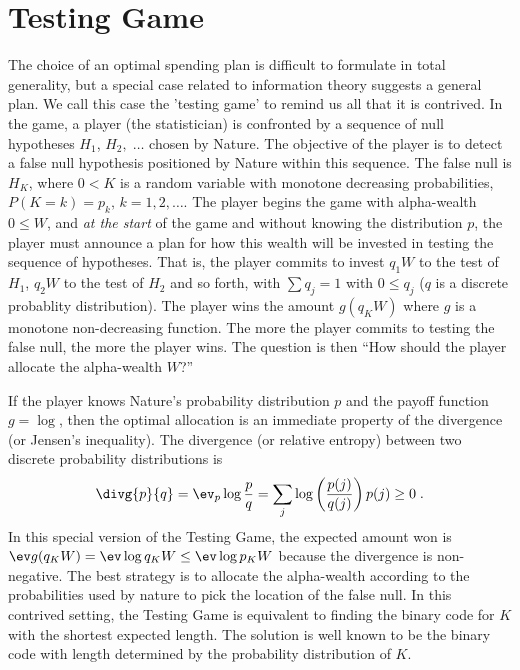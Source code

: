 \documentclass[12pt]{article}
\begin{document}
\section{Testing Game}

 The choice of an optimal spending plan is difficult to formulate in total
 generality, but a special case related to information theory suggests a general
 plan.  We call this case the 'testing game' to remind us all that it is
 contrived.  In the game, a player (the statistician) is confronted by a
 sequence of null hypotheses $H_1$, $H_2, \; \ldots$ chosen by Nature.  The
 objective of the player is to detect a false null hypothesis positioned by
 Nature within this sequence.  The false null is $H_K$, where $0 < K$ is a
 random variable with monotone decreasing probabilities, $P(K=k)=p_k, \,
 k=1,2,\ldots$.  The player begins the game with alpha-wealth $0 \le W$, and
 {\em at the start} of the game and without knowing the distribution $p$, the
 player must announce a plan for how this wealth will be invested in testing the
 sequence of hypotheses.  That is, the player commits to invest $q_1W$ to the
 test of $H_1$, $q_2W$ to the test of $H_2$ and so forth, with $\sum q_j = 1$
 with $0 \le q_j$ ($q$ is a discrete probablity distribution). The player wins
 the amount $g(q_K W)$ where $g$ is a monotone non-decreasing function.  The
 more the player commits to testing the false null, the more the player wins.
  The question is then ``How should the player allocate the alpha-wealth $W$?''


 If the player knows Nature's probability distribution $p$ and the payoff
 function $g = \log$, then the optimal allocation is an immediate property of
 the divergence (or Jensen's inequality).  The divergence (or relative entropy)
 between two discrete probability distributions is
 \begin{equation}
   \divg{p}{q} = \ev_p \log \frac{p}{q} 
               = \sum_j \log\left(\frac{p(j)}{q(j)}\right) p(j) \ge 0 \;.
 \label{eq:divg}
 \end{equation}
 In this special version of the Testing Game, the expected amount won is $\ev
 g(q_KW) = \ev \log q_K W \le \ev \log p_K W$ because the divergence is
 non-negative.  The best strategy is to allocate the alpha-wealth according to
 the probabilities used by nature to pick the location of the false null.  In
 this contrived setting, the Testing Game is equivalent to finding the binary
 code for $K$ with the shortest expected length.  The solution is well known to
 be the binary code with length determined by the probability distribution of
 $K$.  
\end{document}

